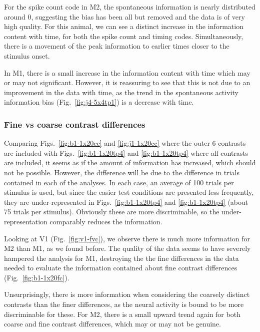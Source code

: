 For the spike count code in M2, the spontaneous information is nearly distributed around 0, suggesting the bias has been all but removed and the data is of very high quality. For this animal, we can see a distinct increase in the information content with time, for both the spike count and timing codes. Simultaneously, there is a movement of the peak information to earlier times closer to the stimulus onset.

In M1, there is a small increase in the information content with time which may or may not significant. However, it is reassuring to see that this is not due to an improvement in the data with time, as the trend in the spontaneous activity information bias (Fig.~\ref{fig:j4-5x4tp1}) is a decrease with time.

\FloatBarrier
\subsubsection{Fine vs coarse contrast differences}

Comparing Figs.~\ref{fig:b1-1x20cc} and \ref{fig:j1-1x20cc} where the outer 6 contrasts are included with Figs.~\ref{fig:b1-1x20tp4} and \ref{fig:b1-1x20tp4} where all contrasts are included, it seems as if the amount of information has increased, which should not be possible. However, the difference will be due to the difference in trials contained in each of the analyses. In each case, an average of 100 trials per stimulus is used, but since the easier test conditions are presented less frequently, they are under-represented in Figs.~\ref{fig:b1-1x20tp4} and \ref{fig:b1-1x20tp4} (about 75 trials per stimulus). Obviously these are more discriminable, so the under-representation comparably reduces the information.

Looking at V1 (Fig.~\ref{fig:v1-fvc}), we observe there is much more information for M2 than M1, as we found before. The quality of the data seems to have severely hampered the analysis for M1, destroying the the fine differences in the data needed to evaluate the information contained about fine contrast differences (Fig.~\ref{fig:b1-1x20fc}).

Unsurprisingly, there is more information when considering the coarsely distinct contrasts than the finer differences, as the neural activity is bound to be more discriminable for these. For M2, there is a small upward trend again for both coarse and fine contrast differences, which may or may not be genuine.

